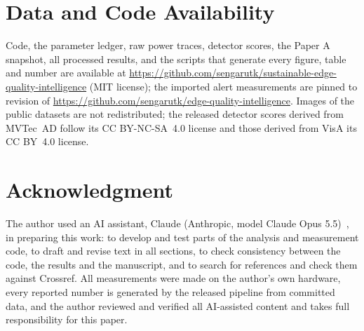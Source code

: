 \section*{Data and Code Availability}
Code, the parameter ledger, raw power traces, detector scores, the Paper A snapshot, all processed results, and the scripts that generate every figure, table and number are available at \url{https://github.com/sengarutk/sustainable-edge-quality-intelligence} (MIT license); the imported alert measurements are pinned to revision \texttt{\PaperACommit} of \url{https://github.com/sengarutk/edge-quality-intelligence}. Images of the public datasets are not redistributed; the released detector scores derived from MVTec~AD follow its CC BY-NC-SA~4.0 license and those derived from VisA its CC BY~4.0 license.

\section*{Acknowledgment}
The author used an AI assistant, Claude (Anthropic, model Claude Opus 5.5)~\cite{anthropic2026claude}, in preparing this work: to develop and test parts of the analysis and measurement code, to draft and revise text in all sections, to check consistency between the code, the results and the manuscript, and to search for references and check them against Crossref. All measurements were made on the author's own hardware, every reported number is generated by the released pipeline from committed data, and the author reviewed and verified all AI-assisted content and takes full responsibility for this paper.
